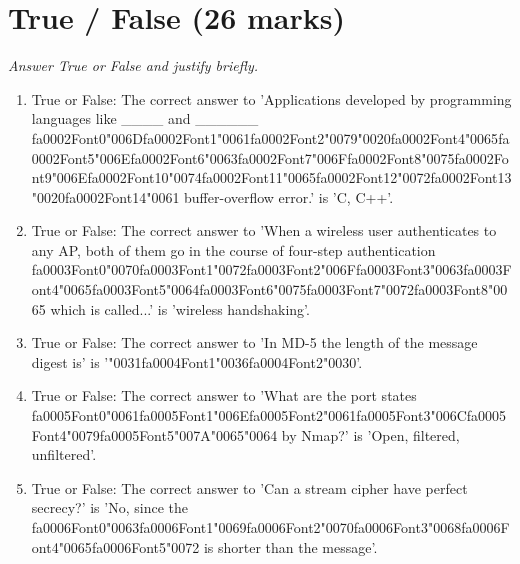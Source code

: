 \documentclass[12pt]{article}
\begin{document}
\section*{True / False (26 marks)}
\textit{Answer True or False and justify briefly.}
\begin{enumerate}[label=\arabic*.]
\item True or False: The correct answer to 'Applications developed by programming languages like \_\_\_\_ and \_\_\_\_\_\_ {\csname fa0002Font0\endcsname\char"006D}{\csname fa0002Font1\endcsname\char"0061}{\csname fa0002Font2\endcsname\char"0079}{\char"0020}{\csname fa0002Font4\endcsname\char"0065}{\csname fa0002Font5\endcsname\char"006E}{\csname fa0002Font6\endcsname\char"0063}{\csname fa0002Font7\endcsname\char"006F}{\csname fa0002Font8\endcsname\char"0075}{\csname fa0002Font9\endcsname\char"006E}{\csname fa0002Font10\endcsname\char"0074}{\csname fa0002Font11\endcsname\char"0065}{\csname fa0002Font12\endcsname\char"0072}{\csname fa0002Font13\endcsname\char"0020}{\csname fa0002Font14\endcsname\char"0061} buffer-overflow error.' is 'C, C++'.
\item True or False: The correct answer to 'When a wireless user authenticates to any AP, both of them go in the course of four-step authentication {\csname fa0003Font0\endcsname\char"0070}{\csname fa0003Font1\endcsname\char"0072}{\csname fa0003Font2\endcsname\char"006F}{\csname fa0003Font3\endcsname\char"0063}{\csname fa0003Font4\endcsname\char"0065}{\csname fa0003Font5\endcsname\char"0064}{\csname fa0003Font6\endcsname\char"0075}{\csname fa0003Font7\endcsname\char"0072}{\csname fa0003Font8\endcsname\char"0065} which is called...' is 'wireless handshaking'.
\item True or False: The correct answer to 'In MD-5 the length of the message digest is' is '{\char"0031}{\csname fa0004Font1\endcsname\char"0036}{\csname fa0004Font2\endcsname\char"0030}'.
\item True or False: The correct answer to 'What are the port states {\csname fa0005Font0\endcsname\char"0061}{\csname fa0005Font1\endcsname\char"006E}{\csname fa0005Font2\endcsname\char"0061}{\csname fa0005Font3\endcsname\char"006C}{\csname fa0005Font4\endcsname\char"0079}{\csname fa0005Font5\endcsname\char"007A}{\char"0065}{\char"0064} by Nmap?' is 'Open, filtered, unfiltered'.
\item True or False: The correct answer to 'Can a stream cipher have perfect secrecy?' is 'No, since the {\csname fa0006Font0\endcsname\char"0063}{\csname fa0006Font1\endcsname\char"0069}{\csname fa0006Font2\endcsname\char"0070}{\csname fa0006Font3\endcsname\char"0068}{\csname fa0006Font4\endcsname\char"0065}{\csname fa0006Font5\endcsname\char"0072} is shorter than the message'.

\end{enumerate}
\end{document}
